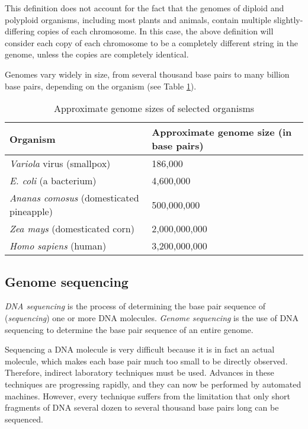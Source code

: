 \documentclass[10pt]{article}
\newcommand{\KeyTerm}[1]{{\it #1}}
\begin{document}
This definition does not account for the fact that the genomes of diploid and
polyploid organisms, including most plants and animals, contain multiple
slightly-differing copies of each chromosome.  In this case, the above
definition will consider each copy of each chromosome to be a completely
different string in the genome, unless the copies are completely identical.

Genomes vary widely in size, from several thousand base pairs to many billion
base pairs, depending on the organism (see Table \ref{tab:GenomeSizes}).

\begin{table}[H]
	\begin{center}
		\begin{tabular}{|l|p{4.5cm}|}
			\hline
			{\bf Organism} & {\bf Approximate genome size (in base
			pairs)} \\
			\hline
			{\it Variola} virus (smallpox) &  186,000 \\
			\hline
			{\it E. coli} (a bacterium) & 4,600,000 \\
			\hline
			{\it Ananas comosus} (domesticated pineapple) & 500,000,000 \\
			\hline
			{\it Zea mays} (domesticated corn) & 2,000,000,000 \\
			\hline
			{\it Homo sapiens} (human)       &  3,200,000,000 \\
			\hline
		\end{tabular}
	\end{center}
	\caption{Approximate genome sizes of selected organisms}
	\label{tab:GenomeSizes}
\end{table}

\subsection{Genome sequencing}

\KeyTerm{DNA sequencing} is the process of determining the base pair sequence of
(\KeyTerm{sequencing}) one or more DNA molecules.  \KeyTerm{Genome sequencing}
is the use of DNA sequencing to determine the base pair sequence of an entire
genome.

Sequencing a DNA molecule is very difficult because it is in fact an actual
molecule, which makes each base pair much too small to be directly observed.
Therefore, indirect laboratory techniques must be used.  Advances in these
techniques are progressing rapidly, and they can now be performed by automated
machines.  However, every technique suffers from the limitation that only short
fragments of DNA several dozen to several thousand base pairs long can be
sequenced.
\end{document}
